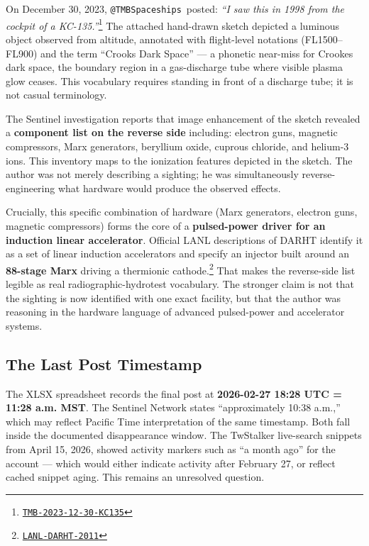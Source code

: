 \documentclass[11pt]{article}
\makeatletter
\newcommand{\account}{\texttt{@TMBSpaceships}}
\newcommand{\src}[2]{\href{#1}{\texttt{#2}}}
\makeatother
\begin{document}
On December 30, 2023, \account\ posted: \emph{``I saw this in 1998 from the cockpit of a KC-135.''}\footnote{\src{https://x.com/TMBSPACESHIPS/status/1741048879699898397}{TMB-2023-12-30-KC135}} The attached hand-drawn sketch depicted a luminous object observed from altitude, annotated with flight-level notations (FL1500--FL900) and the term ``Crooks Dark Space'' — a phonetic near-miss for Crookes dark space, the boundary region in a gas-discharge tube where visible plasma glow ceases. This vocabulary requires standing in front of a discharge tube; it is not casual terminology.

The Sentinel investigation reports that image enhancement of the sketch revealed a \textbf{component list on the reverse side} including: electron guns, magnetic compressors, Marx generators, beryllium oxide, cuprous chloride, and helium-3 ions. This inventory maps to the ionization features depicted in the sketch. The author was not merely describing a sighting; he was simultaneously reverse-engineering what hardware would produce the observed effects.

Crucially, this specific combination of hardware (Marx generators, electron guns, magnetic compressors) forms the core of a \textbf{pulsed-power driver for an induction linear accelerator}. Official LANL descriptions of DARHT identify it as a set of linear induction accelerators and specify an injector built around an \textbf{88-stage Marx} driving a thermionic cathode.\footnote{\src{https://laro.lanl.gov/esploro/outputs/conferenceProceeding/Design-and-performance-of-the-DARHT/9916364413003761}{LANL-DARHT-2011}} That makes the reverse-side list legible as real radiographic-hydrotest vocabulary. The stronger claim is not that the sighting is now identified with one exact facility, but that the author was reasoning in the hardware language of advanced pulsed-power and accelerator systems.

\subsection{The Last Post Timestamp}

The XLSX spreadsheet records the final post at \textbf{2026-02-27 18:28 UTC = 11:28 a.m. MST}. The Sentinel Network states ``approximately 10:38 a.m.,'' which may reflect Pacific Time interpretation of the same timestamp. Both fall inside the documented disappearance window. The TwStalker live-search snippets from April 15, 2026, showed activity markers such as ``a month ago'' for the account — which would either indicate activity after February 27, or reflect cached snippet aging. This remains an unresolved question.
\end{document}
